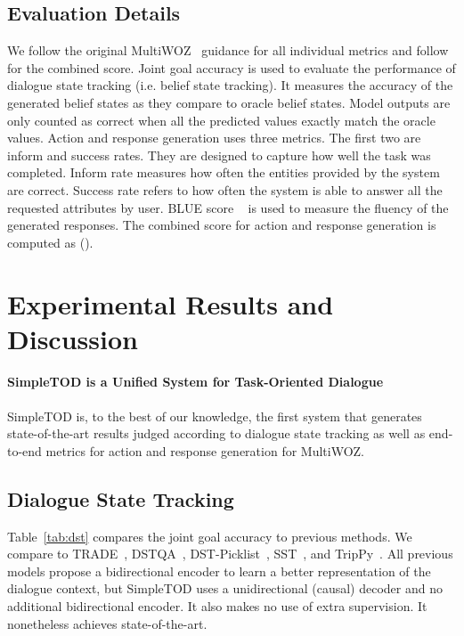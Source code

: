 \documentclass{article}
\begin{document}
\subsection{Evaluation Details}
We follow the original MultiWOZ~\citep{budzianowski2018towards} guidance for all individual metrics and follow~\citet{mehri2019structured} for the combined score.
Joint goal accuracy is used to evaluate the performance of dialogue state tracking (i.e. belief state tracking).
It measures the accuracy of the generated belief states as they compare to oracle belief states.
Model outputs are only counted as correct when all the predicted values exactly match the oracle values.
Action and response generation uses three metrics.
The first two are inform and success rates.
They are designed to capture how well the task was completed. 
Inform rate measures how often the entities provided by the system are correct. 
Success rate refers to how often the system is able to answer all the requested attributes by user.
BLUE score ~\citep{papineni2002bleu} is used to measure the fluency of the generated responses. 
The combined score for action and response generation is computed as ().
 \section{Experimental Results and Discussion}
\label{sec:experimental-results}

\paragraph{SimpleTOD is a Unified System for Task-Oriented Dialogue} 
SimpleTOD is, to the best of our knowledge, the first system that generates state-of-the-art results judged according to dialogue state tracking as well as end-to-end metrics for action and response generation for MultiWOZ.


\subsection{Dialogue State Tracking}
\label{ssec:bst}
Table~\ref{tab:dst} compares the joint goal accuracy to previous methods.
We compare to TRADE~\citep{trade2019wu}, DSTQA~\citep{zhou2019multi}, DST-Picklist~\citep{zhang2019find}, SST~\citep{schema2020chen}, and TripPy~\cite{heck2020trippy}.
All previous models propose a bidirectional encoder to learn a better representation of the dialogue context, 
but SimpleTOD uses a unidirectional (causal) decoder and no additional bidirectional encoder.
It also makes no use of extra supervision.
It nonetheless achieves state-of-the-art. 
\end{document}

